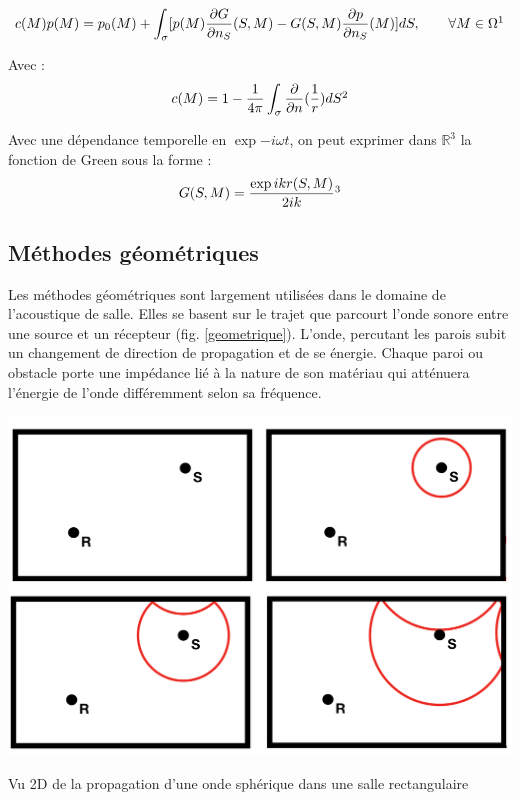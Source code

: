 \begin{equation}
c(M)p(M) = p_0(M) + \int_\sigma [p(M) \frac{\partial G}{\partial n_S}(S,M) - G(S,M) \frac{\partial p}{\partial n_S}(M)] dS,	 	\qquad  \forall M  \in \Omega
\footnotemark
\end{equation}

Avec : \\
\begin{equation}
c(M) = 1 - \frac{1}{4\pi} \int_\sigma \frac{\partial}{\partial n} (\frac{1}{r})dS
\footnotemark
\end{equation}


Avec une dépendance temporelle en $\exp{-i \omega t}$, on peut exprimer dans $\mathbb{R}^3$ la fonction de Green sous la forme :
\begin{equation}
G(S,M) = \frac{\exp{ikr(S,M)}}{2ik}
\footnotemark
\end{equation}




	\subsection{Méthodes géométriques}
	
Les méthodes géométriques sont largement utilisées dans le domaine de l'acoustique de salle. Elles se basent sur le trajet que parcourt l'onde sonore entre une source et un récepteur (fig. \ref{geometrique}). L'onde, percutant les parois subit un changement de direction de propagation et de se énergie. Chaque paroi ou obstacle porte une impédance lié à la nature de son matériau qui atténuera l'énergie de l'onde différemment selon sa fréquence.

\begin{figureth}
	\includegraphics[width=0.8\linewidth]{images/geometrique}
	\caption{Vu 2D de la propagation d'une onde sphérique dans une salle rectangulaire}
	\label{geometrique}
\end{figureth}

